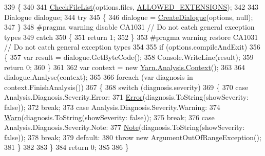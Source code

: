 \begin{DoxyCode}
339         \{
340 
341             \hyperlink{a00195_ad77564b25725a771f0fd4da430582e6f}{CheckFileList}(options.files, \hyperlink{a00195_a0979de7ea02c8c0375b8220a12e6575e}{ALLOWED\_EXTENSIONS});
342 
343             Dialogue dialogue;
344             \textcolor{keywordflow}{try}
345             \{
346                 dialogue = \hyperlink{a00195_aab244361a510cee18ad2f636d110e0d5}{CreateDialogue}(options, null);
347             \}
348 \textcolor{preprocessor}{#pragma warning disable CA1031 // Do not catch general exception types}
349 \textcolor{preprocessor}{}            \textcolor{keywordflow}{catch}
350             \{
351                 \textcolor{keywordflow}{return} 1;
352             \}
353 \textcolor{preprocessor}{#pragma warning restore CA1031 // Do not catch general exception types}
354 \textcolor{preprocessor}{}
355             \textcolor{keywordflow}{if} (options.compileAndExit)
356             \{
357                 var result = dialogue.GetByteCode();
358                 Console.WriteLine(result);
359                 \textcolor{keywordflow}{return} 0;
360             \}
361 
362             var context = \textcolor{keyword}{new} \hyperlink{a00057}{Yarn.Analysis.Context}();
363 
364             dialogue.Analyse(context);
365 
366             \textcolor{keywordflow}{foreach} (var diagnosis \textcolor{keywordflow}{in} context.FinishAnalysis())
367             \{
368                 \textcolor{keywordflow}{switch} (diagnosis.severity)
369                 \{
370                     \textcolor{keywordflow}{case} Analysis.Diagnosis.Severity.Error:
371                         \hyperlink{a00195_a2f63f9f5b7634cb50ee75ff2eb18b137}{Error}(diagnosis.ToString(showSeverity: \textcolor{keyword}{false}));
372                         \textcolor{keywordflow}{break};
373                     \textcolor{keywordflow}{case} Analysis.Diagnosis.Severity.Warning:
374                         \hyperlink{a00195_a979bb6f049b6c5294f745a19e24ddd9d}{Warn}(diagnosis.ToString(showSeverity: \textcolor{keyword}{false}));
375                         \textcolor{keywordflow}{break};
376                     \textcolor{keywordflow}{case} Analysis.Diagnosis.Severity.Note:
377                         \hyperlink{a00195_a939cc9e943c574b36c6af93e9c772702}{Note}(diagnosis.ToString(showSeverity: \textcolor{keyword}{false}));
378                         \textcolor{keywordflow}{break};
379                     \textcolor{keywordflow}{default}:
380                         \textcolor{keywordflow}{throw} \textcolor{keyword}{new} ArgumentOutOfRangeException();
381                 \}
382 
383             \}
384             \textcolor{keywordflow}{return} 0;
385 
386         \}
\end{DoxyCode}


